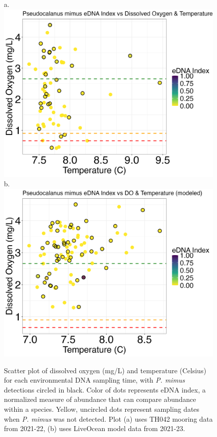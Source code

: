 \documentclass[12pt,twoside]{reedthesis}
\begin{document}
	\begin{figure}[!h]
		\begin{center}
			a. \includegraphics[scale=0.3]{Pmimus_Scatter_noOut}
			b. \includegraphics[scale=0.3]{Pmimus_Scatter_AllYr_mod_noOut}
			\caption[\textit{P. mimus} scatterplot]{\footnotesize{Scatter plot of dissolved oxygen (mg/L) and temperature (Celsius) for each environmental DNA sampling time, with \textit{P. mimus} detections circled in black. Color of dots represents eDNA index, a normalized measure of abundance that can compare abundance within a species. Yellow, uncircled dots represent sampling dates when \textit{P. mimus} was not detected. Plot (a) uses TH042 mooring data from 2021-22, (b) uses LiveOcean model data from 2021-23.}} %
			\label{PmimusScatter}
			\end{center}
	\end{figure} 
	
\end{document}
